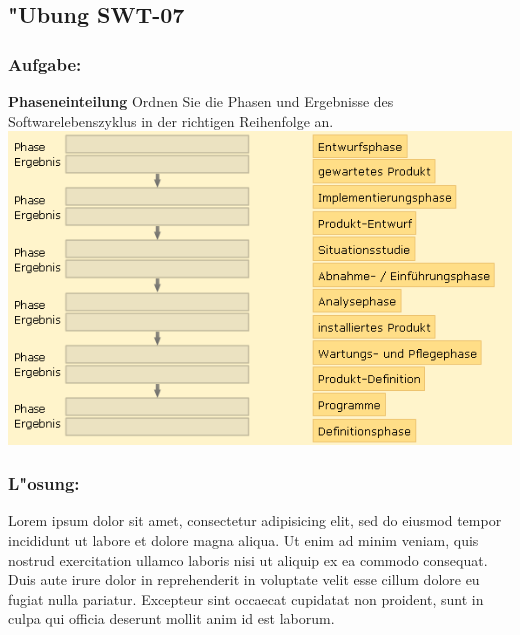 \newpage
\subsection{"Ubung SWT-07}
\subsubsection*{Aufgabe:}

\begin{framed}
\textbf{Phaseneinteilung}
\smallbreak
Ordnen Sie die Phasen und Ergebnisse des Softwarelebenszyklus in der richtigen Reihenfolge an.
\bigbreak
\includegraphics[width=1.0\textwidth]{./images/ueb01-07.png}
\end{framed}
\bigbreak
\bigbreak
\subsubsection*{L"osung:}
Lorem ipsum dolor sit amet, consectetur adipisicing elit, sed do eiusmod tempor incididunt ut labore et dolore magna aliqua. Ut enim ad minim veniam, quis nostrud exercitation ullamco laboris nisi ut aliquip ex ea commodo consequat. Duis aute irure dolor in reprehenderit in voluptate velit esse cillum dolore eu fugiat nulla pariatur. Excepteur sint occaecat cupidatat non proident, sunt in culpa qui officia deserunt mollit anim id est laborum.










\clearpage
\printbibliography[heading=bibintoc]
\newpage
\printglossary[type=main]
\printglossary[type=\acronymtype]




